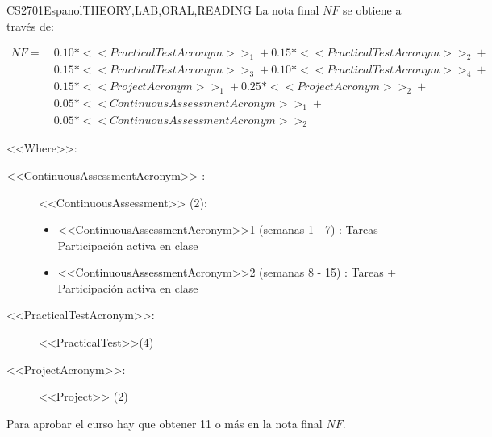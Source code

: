     \begin{evaluation}{CS2701}{Espanol}{THEORY,LAB,ORAL,READING}
    La nota final $NF$ se obtiene a través de:
    
    \begin{equation}
       \begin{split}
           NF =~  & 0.10*<<PracticalTestAcronym>>_{1} + 0.15*<<PracticalTestAcronym>>_{2} + \\
                      & 0.15*<<PracticalTestAcronym>>_{3} + 0.10*<<PracticalTestAcronym>>_{4} +\\ 
                      & 0.15*<<ProjectAcronym>>_{1} + 0.25*<<ProjectAcronym>>_{2} + \\
                      & 0.05 *<<ContinuousAssessmentAcronym>>_{1} + \\
                      & 0.05 *<<ContinuousAssessmentAcronym>>_{2} 
       \end{split}
    \end{equation}
    
    \noindent <<Where>>:
    \begin{description}
        \item[<<ContinuousAssessmentAcronym>> :] <<ContinuousAssessment>> (2):
    \begin{itemize}
               \item  <<ContinuousAssessmentAcronym>>1 (semanas 1 - 7) : Tareas + Participación activa en clase 
                \item <<ContinuousAssessmentAcronym>>2 (semanas 8 - 15) : Tareas + Participación activa en clase 
         \end{itemize}
        \item[<<PracticalTestAcronym>>:] <<PracticalTest>>(4)
        \item[<<ProjectAcronym>>:] <<Project>> (2)     
    \end{description}
    \noindent Para aprobar el curso hay que obtener 11 o más en la nota final $NF$.
    \end{evaluation}
    
    
    
